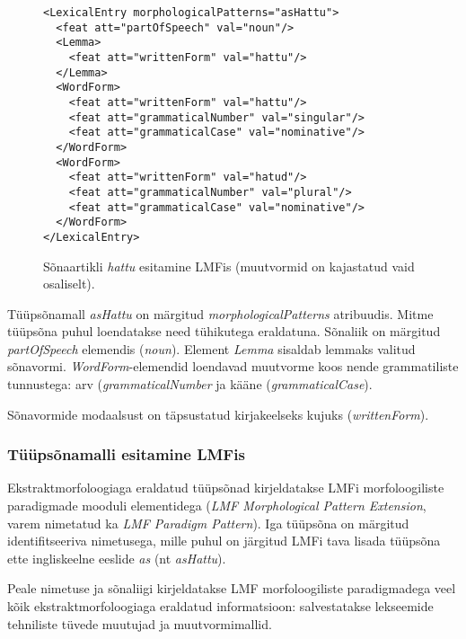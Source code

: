 \documentclass[12pt,a4paper]{article}
\begin{document}
\begin{figure}[h]
  \center
\begin{verbatim}
<LexicalEntry morphologicalPatterns="asHattu">
  <feat att="partOfSpeech" val="noun"/>
  <Lemma>
    <feat att="writtenForm" val="hattu"/>
  </Lemma>
  <WordForm>
    <feat att="writtenForm" val="hattu"/>
    <feat att="grammaticalNumber" val="singular"/>
    <feat att="grammaticalCase" val="nominative"/>
  </WordForm>
  <WordForm>
    <feat att="writtenForm" val="hatud"/>
    <feat att="grammaticalNumber" val="plural"/>
    <feat att="grammaticalCase" val="nominative"/>
  </WordForm>
</LexicalEntry>
\end{verbatim}
\caption{Sõnaartikli \textit{hattu} esitamine LMFis (muutvormid on kajastatud vaid osaliselt).
  \label{code:lmf-lexicalentry}}
\end{figure}

Tüüpsõnamall \textit{asHattu} on märgitud \textit{morphological\-Patterns} atribuudis. Mitme tüüpsõna puhul loendatakse need tühikutega eraldatuna. Sõnaliik on märgitud \textit{part\-Of\-Speech} elemendis (\textit{noun}). Element \textit{Lemma} sisaldab lemmaks valitud sõnavormi. \textit{Word\-Form}-elemendid loendavad muutvorme koos nende grammatiliste tunnustega: arv (\textit{grammatical\-Number} ja kääne (\textit{grammatical\-Case}).

Sõnavormide modaalsust on täpsustatud kirjakeelseks kujuks (\textit{writtenForm}).




\subsubsection{Tüüpsõnamalli esitamine LMFis}

Ekstraktmorfoloogiaga eraldatud tüüpsõnad kirjeldatakse LMFi morfoloogiliste paradigmade mooduli elementidega (\textit{LMF Morphological Pattern Extension}, varem nimetatud ka \textit{LMF Paradigm Pattern}). Iga tüüpsõna on märgitud identifitseeriva nimetusega, mille puhul on järgitud LMFi tava lisada tüüpsõna ette ingliskeelne eeslide \textit{as} (nt \textit{asHattu}).

Peale nimetuse ja sõnaliigi kirjeldatakse LMF morfoloogiliste paradigmadega veel kõik ekstraktmorfoloogiaga eraldatud informatsioon: salvestatakse lekseemide tehniliste tüvede muutujad ja muutvormimallid.
\end{document}
